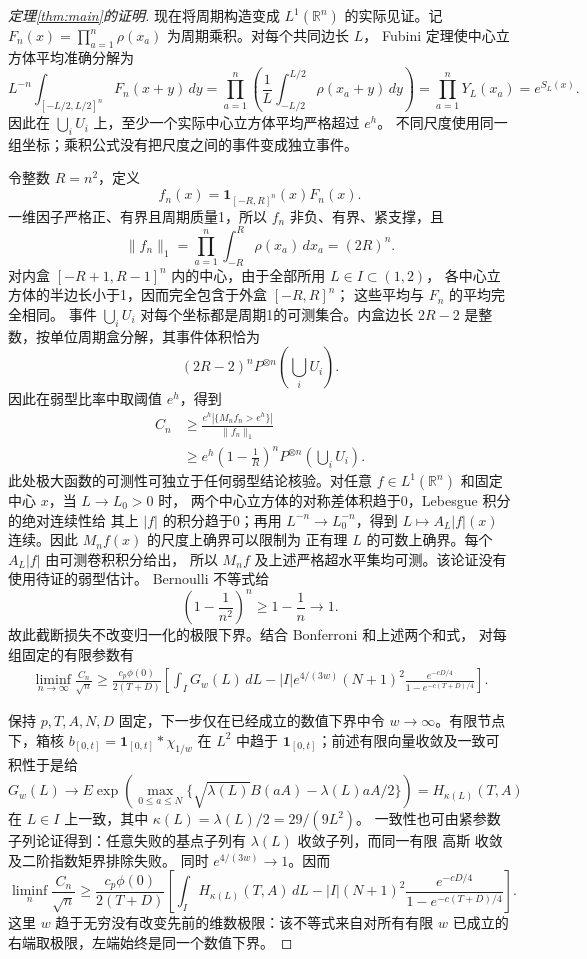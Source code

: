 \documentclass[UTF8,a4paper,11pt,fontset=fandol]{ctexart}
\theoremstyle{remark}
\begin{document}
\begin{proof}[定理\ref{thm:main}的证明]
现在将周期构造变成 $L^1(\mathbb R^n)$ 的实际见证。记
$F_n(x)=\prod_{a=1}^n\rho(x_a)$ 为周期乘积。对每个共同边长 $L$，
Fubini 定理使中心立方体平均准确分解为
\[
 L^{-n}\int_{[-L/2,L/2]^n}F_n(x+y)\,dy
 =\prod_{a=1}^n\left(\frac1L\int_{-L/2}^{L/2}\rho(x_a+y)\,dy\right)
 =\prod_{a=1}^nY_L(x_a)=e^{S_L(x)}.
\]
因此在 $\bigcup_iU_i$ 上，至少一个实际中心立方体平均严格超过 $e^h$。
不同尺度使用同一组坐标；乘积公式没有把尺度之间的事件变成独立事件。

令整数 $R=n^2$，定义
\[
 f_n(x)=\mathbf1_{[-R,R]^n}(x)F_n(x).
\]
一维因子严格正、有界且周期质量1，所以 $f_n$ 非负、有界、紧支撑，且
\[
 \|f_n\|_1=\prod_{a=1}^n\int_{-R}^R\rho(x_a)\,dx_a=(2R)^n.
\]
对内盒 $[-R+1,R-1]^n$ 内的中心，由于全部所用 $L\in I\subset(1,2)$，
各中心立方体的半边长小于1，因而完全包含于外盒 $[-R,R]^n$；
这些平均与 $F_n$ 的平均完全相同。
事件 $\bigcup_iU_i$ 对每个坐标都是周期1的可测集合。内盒边长
$2R-2$ 是整数，按单位周期盒分解，其事件体积恰为
\[
 (2R-2)^nP^{\otimes n}\left(\bigcup_iU_i\right).
\]
因此在弱型比率中取阈值 $e^h$，得到
\begin{align*}
 C_n&\ge\frac{e^h|\{M_nf_n>e^h\}|}{\|f_n\|_1}\\
 &\ge e^h\left(1-\frac1R\right)^n
 P^{\otimes n}\left(\bigcup_iU_i\right).
\end{align*}
此处极大函数的可测性可独立于任何弱型结论核验。对任意
$f\in L^1(\mathbb R^n)$ 和固定中心 $x$，当 $L\to L_0>0$ 时，
两个中心立方体的对称差体积趋于0，Lebesgue 积分的绝对连续性给
其上 $|f|$ 的积分趋于0；再用 $L^{-n}\to L_0^{-n}$，得到
$L\mapsto A_L|f|(x)$ 连续。因此 $M_nf(x)$ 的尺度上确界可以限制为
正有理 $L$ 的可数上确界。每个 $A_L|f|$ 由可测卷积积分给出，
所以 $M_nf$ 及上述严格超水平集均可测。该论证没有使用待证的弱型估计。
Bernoulli 不等式给
\[
 \left(1-\frac1{n^2}\right)^n\ge1-\frac1n\longrightarrow1.
\]
故此截断损失不改变归一化的极限下界。结合 Bonferroni 和上述两个和式，
对每组固定的有限参数有
\begin{align*}
 \liminf_{n\to\infty}\frac{C_n}{\sqrt n}
 \ge\frac{c_p\phi(0)}{2(T+D)}\left[
 \int_I G_w(L)\,dL
 -|I|e^{4/(3w)}(N+1)^2
 \frac{e^{-cD/4}}{1-e^{-c(T+D)/4}}\right].
\end{align*}

保持 $p,T,A,N,D$ 固定，下一步仅在已经成立的数值下界中令
$w\to\infty$。有限节点下，箱核
$b_{[0,t]}=\mathbf1_{[0,t]}*\chi_{1/w}$ 在 $L^2$ 中趋于
$\mathbf1_{[0,t]}$；前述有限向量收敛及一致可积性于是给
\[
 G_w(L)\longrightarrow
 E\exp\!\left(\max_{0\le a\le N}
 \{\sqrt{\lambda(L)}B(aA)-\lambda(L)aA/2\}\right)
 =H_{\kappa(L)}(T,A)
\]
在 $L\in I$ 上一致，其中
$\kappa(L)=\lambda(L)/2=29/(9L^2)$。
一致性也可由紧参数子列论证得到：任意失败的基点子列有
$\lambda(L)$ 收敛子列，而同一有限 高斯 收敛及二阶指数矩界排除失败。
同时 $e^{4/(3w)}\to1$。因而
\begin{equation}\label{eq:paperfinitebound}
 \liminf_n\frac{C_n}{\sqrt n}\ge
 \frac{c_p\phi(0)}{2(T+D)}
 \left[\int_I H_{\kappa(L)}(T,A)\,dL
 -|I|(N+1)^2\frac{e^{-cD/4}}{1-e^{-c(T+D)/4}}\right].
\end{equation}
这里 $w$ 趋于无穷没有改变先前的维数极限：该不等式来自对所有有限
$w$ 已成立的右端取极限，左端始终是同一个数值下界。


\end{proof}
\end{document}

